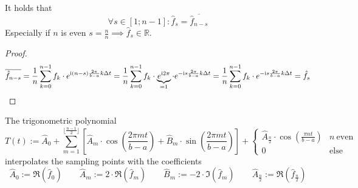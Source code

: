 \begin{lemma}
   It holds that
   \[\forall s \in [1; n-1]: \hat{f}_s = \overline{\hat{f}_{n-s}}\]
   Especially if \(n\) is even \(s = \frac{n}{n} \implies \hat{f}_s \in \mathbb{R}\).
\end{lemma}
\begin{proof}
   \[\overline{\hat{f}_{n-s}} = \frac{1}{n} \sum_{k=0}^{n-1} f_k \cdot e^{\mathrm{i} (n-s) \frac{2\pi}{b-a} k \Delta t} = \frac{1}{n} \sum_{k=0}^{n-1} f_k \cdot \underbrace{e^{\mathrm{i} 2\pi}}_{=1} \cdot e^{-\mathrm{i} s \frac{2\pi}{b-a} k \Delta t} = \frac{1}{n} \sum_{k=0}^{n-1} f_k \cdot e^{-\mathrm{i} s \frac{2\pi}{b-a}k \Delta t} = \hat{f}_s\]
\end{proof}

\begin{lemma}
   The trigonometric polynomial
   \[T(t) := \hat{A}_0 + \sum_{m=1}^{\lfloor\frac{n-1}{2}\rfloor} \left[\hat{A}_m \cdot \cos\left(\frac{2\pi mt}{b-a}\right) + \hat{B}_m \cdot \sin\left(\frac{2\pi mt}{b-a}\right) \right] + \begin{cases}\hat{A}_{\frac{n}{2}} \cdot \cos\left(\frac{\pi n t}{b-a}\right) & n~\text{even}\\ 0 & \text{else}\end{cases}\]
   interpolates the sampling points with the coefficients
   \[\hat{A}_0 := \Re(\hat{f}_0) \qquad \hat{A}_m := 2 \cdot \Re(\hat{f}_m) \qquad \hat{B}_m := -2 \cdot \Im(\hat{f}_m) \qquad \hat{A}_{\frac{n}{2}} := \Re(\hat{f}_{\frac{n}{2}})\]
\end{lemma}
